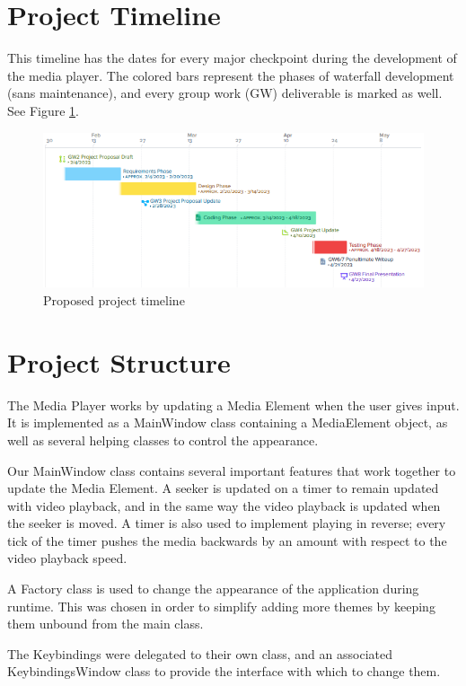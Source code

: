 \documentclass[10pt,conference,onecolumn,compsoc]{IEEEtran}
\begin{document}
\clearpage
\section{Project Timeline}
This timeline has the dates for every major checkpoint during the development of the media player. The colored bars represent the phases of waterfall development (sans maintenance), and every group work (GW) deliverable is marked as well.
See Figure \ref{timeline}.

\begin{figure}[H]
\begin{center}
\includegraphics[scale=1.5]{Project_Timeline.png}
\caption{Proposed project timeline}
\label{timeline}
\end{center}
\end{figure}

\section{Project Structure}
The Media Player works by updating a Media Element when the user gives input. It is implemented as a MainWindow class containing a MediaElement object, as well as several helping classes to control the appearance. \medskip

Our MainWindow class contains several important features that work together to update the Media Element. A seeker is updated on a timer to remain updated with video playback, and in the same way the video playback is updated when the seeker is moved. A timer is also used to implement playing in reverse; every tick of the timer pushes the media backwards by an amount with respect to the video playback speed.   \par
A Factory class is used to change the appearance of the application during runtime. This was chosen in order to simplify adding more themes by keeping them unbound from the main class. \par
The Keybindings were delegated to their own class, and an associated KeybindingsWindow class to provide the interface with which to change them. 
\end{document}

